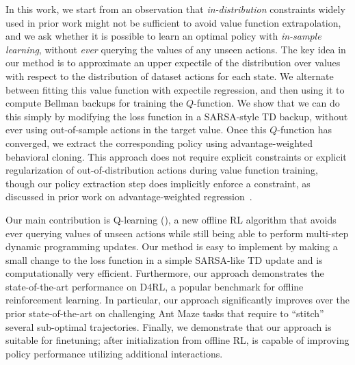 In this work, we start from an observation that \emph{in-distribution} constraints widely used in prior work might not be sufficient to avoid value function extrapolation, and we ask whether it is possible to learn an optimal policy with \emph{in-sample learning}, without \emph{ever} querying the values of any unseen actions.
The key idea in our method is to approximate an upper expectile of the distribution over values with respect to the distribution of dataset actions for each state. We alternate between fitting this value function with expectile regression, and then using it to compute Bellman backups for training the $Q$-function.
We show that we can do this simply by modifying the loss function in a SARSA-style TD backup, without ever using out-of-sample actions in the target value.
Once this $Q$-function has converged, we extract the corresponding policy using advantage-weighted behavioral cloning.
This approach does not require explicit constraints or explicit regularization of out-of-distribution actions during value function training, though our policy extraction step does implicitly enforce a constraint, as discussed in prior work on advantage-weighted regression~\citep{peters2007reinforcement, peng2019advantage, nair2020awac, wang2020critic}.

Our main contribution is \ournamepref Q-learning (\ourname), a new offline RL algorithm that avoids ever querying values of unseen actions while still being able to perform multi-step dynamic programming updates.
Our method is easy to implement by making a small change to the loss function in a simple SARSA-like TD update and is computationally very efficient. Furthermore, our approach demonstrates the state-of-the-art performance on D4RL, a popular benchmark for offline reinforcement learning. In particular, our approach significantly improves over the prior state-of-the-art on challenging Ant Maze tasks that require to ``stitch'' several sub-optimal trajectories. Finally, we demonstrate that our approach is suitable for finetuning; after initialization from offline RL, \ourname is capable of improving policy performance utilizing additional interactions.

